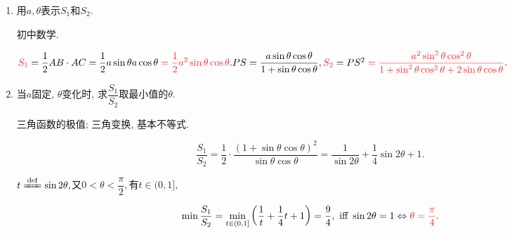 \documentclass[8pt]{article}
\begin{document}
		\begin{enumerate}[label=(\arabic*)]
			\item 用$a, \theta$表示$S_1$和$S_2$.

				初中数学.

				$\ansmath{S_1}=\dfrac{1}{2}AB\cdot AC=\dfrac{1}{2}a\sin \theta a\cos \theta \ansmath{= \dfrac{1}{2} a^2 \sin \theta \cos \theta}. PS = \dfrac{a\sin \theta \cos \theta}{1 + \sin \theta \cos \theta}, \\\ansmath{S_2}=PS^2\ansmath{=\dfrac{a^2 \sin^2 \theta \cos^2 \theta}{1 + \sin^2 \theta \cos^2 \theta + 2\sin \theta \cos \theta}}.$

				

			\item 当$a$固定, $\theta$变化时, 求$\dfrac{S_1}{S_2}$取最小值的$\theta$.

				三角函数的极值; 三角变换, 基本不等式.

				$$\frac{S_1}{S_2}=\frac{1}{2}\cdot\frac{(1+\sin\theta\cos\theta)^2}{\sin \theta \cos \theta}=\frac{1}{\sin 2\theta} + \frac{1}{4} \sin 2\theta + 1.$$

				$t \ddef \sin 2\theta, $又$0 < \theta < \dfrac{\pi}{2},$有$t\in(0, 1],$

				$$\min \frac{S_1}{S_2} = \min_{t\in(0, 1]}\left(\frac{1}{t} + \frac{1}{4} t + 1\right) = \dfrac{9}{4}, \Iff \sin 2\theta = 1 \Leftrightarrow \ansmath{\theta = \dfrac{\pi}{4}}. $$

		\end{enumerate}
\end{document}
